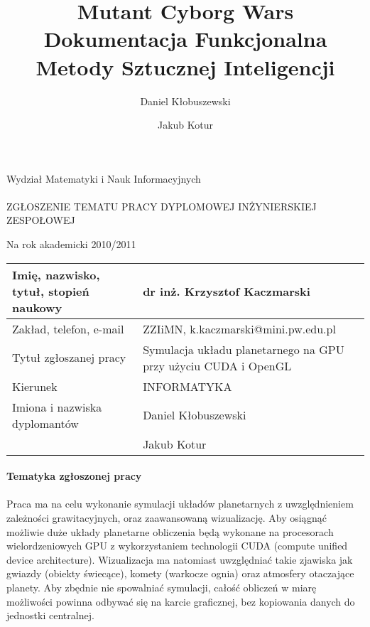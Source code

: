 \documentclass[a4paper,titlepage,10pt]{article}
\title{\huge Mutant Cyborg Wars \\\large Dokumentacja Funkcjonalna\\\small Metody Sztucznej Inteligencji }
\author{Daniel Kłobuszewski\and Jakub Kotur}
\begin{document}
	\paragraph{}

	Wydział Matematyki i Nauk Informacyjnych

	\paragraph{}
	\begin{center}
	ZGŁOSZENIE TEMATU PRACY DYPLOMOWEJ INŻYNIERSKIEJ ZESPOŁOWEJ

	Na rok akademicki 2010/2011
	\end{center}

	\begin{tabular}{ | l | p{} | }
	\hline
	Imię, nazwisko, tytuł, stopień naukowy & dr inż. Krzysztof Kaczmarski \\ \hline
	Zakład, telefon, e-mail & ZZIiMN, k.kaczmarski@mini.pw.edu.pl \\\hline
	Tytuł zgłoszanej pracy & Symulacja układu planetarnego na GPU przy użyciu CUDA i OpenGL \\\hline
	Kierunek & INFORMATYKA \\\hline
	Imiona i nazwiska dyplomantów & Daniel Kłobuszewski\\
	& Jakub Kotur \\\hline
	\end{tabular}

	\paragraph{Tematyka zgłoszonej pracy}

	\paragraph{}

	Praca ma na celu wykonanie symulacji układów planetarnych z uwzględnieniem zależności grawitacyjnych, oraz zaawansowaną wizualizację. Aby osiągnąć możliwie duże układy planetarne obliczenia będą wykonane na procesorach wielordzeniowych GPU z wykorzystaniem technologii CUDA (compute unified device architecture). Wizualizacja ma natomiast uwzględniać takie zjawiska jak gwiazdy (obiekty świecące), komety (warkocze ognia) oraz atmosfery otaczające planety. Aby zbędnie nie spowalniać symulacji, całość obliczeń w miarę możliwości powinna odbywać się na karcie graficznej, bez kopiowania danych do jednostki centralnej.
\end{document}
